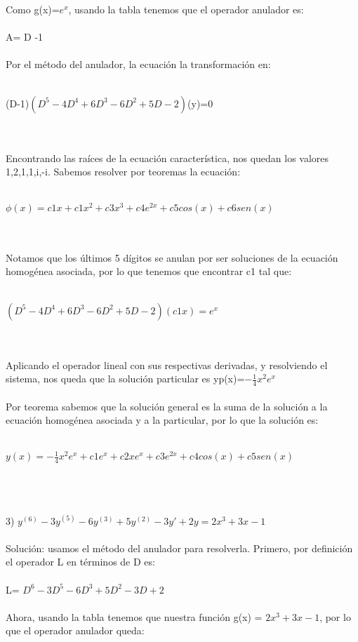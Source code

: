 \documentclass[a4paper,10pt]{article}
\begin{document}
Como g(x)=$e^x$, usando la tabla tenemos que el operador anulador es:\\\\
A= D -1\\\\
Por el método del anulador, la ecuación la transformación en:\\\\
\centerline{(D-1)$(D^5 - 4D^4 + 6D^3 - 6D^2 + 5D - 2)$(y)=0}\\\\
Encontrando las raíces de la ecuación característica, nos quedan los valores 1,2,1,1,i,-i. Sabemos resolver por teoremas la ecuación:\\\\
\centerline{$\phi (x) = c1x + c1x^2 + c3x^3 + c4e^{2x} + c5cos(x) + c6sen(x)$}\\\\
Notamos que los últimos 5 dígitos se anulan por ser soluciones de la ecuación homogénea asociada, por lo que tenemos que encontrar c1 tal que:\\\\
\centerline{$(D^5 - 4D^4 + 6D^3 - 6D^2 + 5D - 2)(c1x)= e^x$}\\\\
Aplicando el operador lineal con sus respectivas derivadas, y resolviendo el sistema, nos queda que la solución particular es yp(x)=$-\frac{1}{4} x^2 e^x$\\\\
Por teorema sabemos que la solución general es la suma de la solución a la ecuación homogénea asociada y a la particular, por lo que la solución es:\\\\
\centerline{$y(x) = -\frac{1}{4} x^2 e^x + c1e^x + c2xe^x + c3e^{2x} + c4cos(x) + c5sen(x)$}\\\\\\
3) $ y^{(6)} - 3y^{(5)} - 6y^{(3)} + 5y^{(2)} - 3y' + 2y = 2x^3 + 3x - 1$ \\\\
Solución: usamos el método del anulador para resolverla. Primero, por definición el operador L en términos de D es:\\\\
L= $D^{6} - 3D^{5} - 6D^{3} + 5D^{2} - 3D + 2$\\\\
Ahora, usando la tabla tenemos que nuestra función g(x) = $ 2x^3 + 3x - 1$, por lo que el operador anulador queda:\\\\
\end{document}
